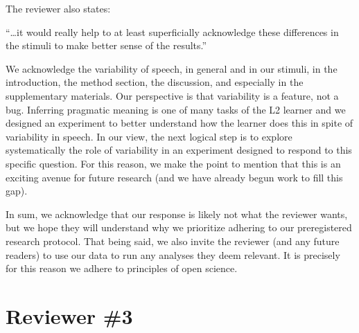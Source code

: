\documentclass[]{article}
\newcommand{\TaskEstimationBox}[2]{%
\ifoptiondraft{\parbox{1.0\linewidth}{\hfill \hfill {\colorbox{#2}{\color{White} \textbf{#1}}}}}%
{}%
}
\def\Done {\TaskEstimationBox{Done}{Blue}}
\def\Easy {\TaskEstimationBox{Feasible}{ForestGreen}}
\begin{document}
The reviewer also states:

``\ldots it would really help to at least superficially acknowledge these differences in the stimuli to make better sense of the results.''

We acknowledge the variability of speech, in general and in our stimuli, in the introduction, the method section, the discussion, and especially in the supplementary materials.
Our perspective is that variability is a feature, not a bug.
Inferring pragmatic meaning is one of many tasks of the L2 learner and we designed an experiment to better understand how the learner does this in spite of variability in speech.
In our view, the next logical step is to explore systematically the role of variability in an experiment designed to respond to this specific question.
For this reason, we make the point to mention that this is an exciting avenue for future research (and we have already begun work to fill this gap).

In sum, we acknowledge that our response is likely not what the reviewer wants, but we hope they will understand why we prioritize adhering to our preregistered research protocol.
That being said, we also invite the reviewer (and any future readers) to use our data to run any analyses they deem relevant.
It is precisely for this reason we adhere to principles of open science.

\Done
\Easy

\clearpage

\hypertarget{reviewer-3}{%
\section{Reviewer \#3}\label{reviewer-3}}

\end{document}
